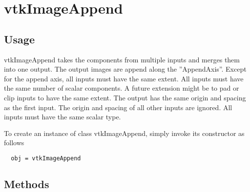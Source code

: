 \section{vtkImageAppend}

\subsection{Usage}

 vtkImageAppend takes the components from multiple inputs and merges
 them into one output. The output images are append along the ''AppendAxis''.
 Except for the append axis, all inputs must have the same extent.
 All inputs must have the same number of scalar components.
 A future extension might be to pad or clip inputs to have the same extent.
 The output has the same origin and spacing as the first input.
 The origin and spacing of all other inputs are ignored.  All inputs
 must have the same scalar type.

To create an instance of class vtkImageAppend, simply
invoke its constructor as follows
\begin{verbatim}
  obj = vtkImageAppend
\end{verbatim}
\subsection{Methods}

